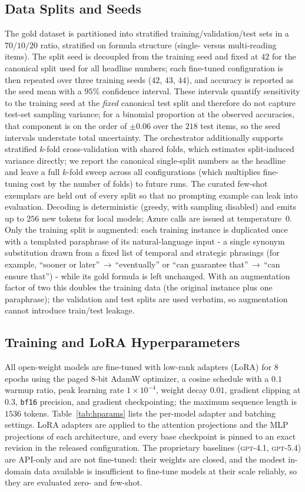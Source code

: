 \documentclass[letterpaper]{article}
\begin{document}
\subsection{Data Splits and Seeds}
The gold dataset is partitioned into stratified training/validation/test sets in a $70/10/20$ ratio, stratified on formula structure (single- versus multi-reading items). The split seed is decoupled from the training seed and fixed at $42$ for the canonical split used for all headline numbers; each fine-tuned configuration is then repeated over three training seeds ($42$, $43$, $44$), and accuracy is reported as the seed mean with a $95\%$ confidence interval. These intervals quantify sensitivity to the training seed at the \emph{fixed} canonical test split and therefore do not capture test-set sampling variance; for a binomial proportion at the observed accuracies, that component is on the order of $\pm0.06$ over the $218$ test items, so the seed intervals understate total uncertainty. The orchestrator additionally supports stratified $k$-fold cross-validation with shared folds, which estimates split-induced variance directly; we report the canonical single-split numbers as the headline and leave a full $k$-fold sweep across all configurations (which multiplies fine-tuning cost by the number of folds) to future runs. The curated few-shot exemplars are held out of every split so that no prompting example can leak into evaluation. Decoding is deterministic (greedy, with sampling disabled) and emits up to $256$ new tokens for local models; Azure calls are issued at temperature~$0$. Only the training split is augmented: each training instance is duplicated once with a templated paraphrase of its natural-language input - a single synonym substitution drawn from a fixed list of temporal and strategic phrasings (for example, ``sooner or later''\,$\rightarrow$\,``eventually'' or ``can guarantee that''\,$\rightarrow$\,``can ensure that'') - while its gold formula is left unchanged. With an augmentation factor of two this doubles the training data (the original instance plus one paraphrase); the validation and test splits are used verbatim, so augmentation cannot introduce train/test leakage.

\subsection{Training and LoRA Hyperparameters}
All open-weight models are fine-tuned with low-rank adapters (LoRA) for $8$ epochs using the paged $8$-bit AdamW optimizer, a cosine schedule with a $0.1$ warmup ratio, peak learning rate $1\times10^{-4}$, weight decay $0.01$, gradient clipping at $0.3$, \texttt{bf16} precision, and gradient checkpointing; the maximum sequence length is $1536$ tokens. Table~\ref{tab:hparams} lists the per-model adapter and batching settings. LoRA adapters are applied to the attention projections and the MLP projections of each architecture, and every base checkpoint is pinned to an exact revision in the released configuration. The proprietary baselines (\textsc{gpt-4.1}, \textsc{gpt-5.4}) are API-only and are not fine-tuned: their weights are closed, and the modest in-domain data available is insufficient to fine-tune models at their scale reliably, so they are evaluated zero- and few-shot.
\end{document}
